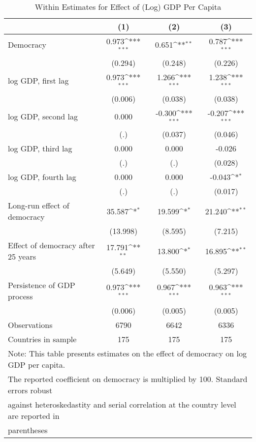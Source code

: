 \begin{table}[htbp]\centering
\def\sym#1{\ifmmode^{#1}\else\(^{#1}\)\fi}
\caption{Within Estimates for Effect of (Log) GDP Per Capita}
\begin{tabular}{l*{3}{c}}
\hline\hline
            &\multicolumn{1}{c}{(1)}         &\multicolumn{1}{c}{(2)}         &\multicolumn{1}{c}{(3)}         \\
\hline
Democracy   &       0.973\sym{***}&       0.651\sym{**} &       0.787\sym{***}\\
            &     (0.294)         &     (0.248)         &     (0.226)         \\
log GDP, first lag&       0.973\sym{***}&       1.266\sym{***}&       1.238\sym{***}\\
            &     (0.006)         &     (0.038)         &     (0.038)         \\
log GDP, second lag&       0.000         &      -0.300\sym{***}&      -0.207\sym{***}\\
            &         (.)         &     (0.037)         &     (0.046)         \\
log GDP, third lag&       0.000         &       0.000         &      -0.026         \\
            &         (.)         &         (.)         &     (0.028)         \\
log GDP, fourth lag&       0.000         &       0.000         &      -0.043\sym{*}  \\
            &         (.)         &         (.)         &     (0.017)         \\
Long-run effect of democracy&      35.587\sym{*}  &      19.599\sym{*}  &      21.240\sym{**} \\
            &    (13.998)         &     (8.595)         &     (7.215)         \\
Effect of democracy after 25 years&      17.791\sym{**} &      13.800\sym{*}  &      16.895\sym{**} \\
            &     (5.649)         &     (5.550)         &     (5.297)         \\
Persistence of GDP process&       0.973\sym{***}&       0.967\sym{***}&       0.963\sym{***}\\
            &     (0.006)         &     (0.005)         &     (0.005)         \\
\hline
Observations&        6790         &        6642         &        6336         \\
Countries in sample&         175         &         175         &         175         \\
\hline\hline
\multicolumn{4}{l}{\footnotesize Note: This table presents estimates on the effect of democracy on log GDP per capita.}\\
\multicolumn{4}{l}{\footnotesize The reported coefficient on democracy is multiplied by 100. Standard errors robust}\\
\multicolumn{4}{l}{\footnotesize against heteroskedastity and serial correlation at the country level are reported in}\\
\multicolumn{4}{l}{\footnotesize parentheses}\\
\end{tabular}
\end{table}
